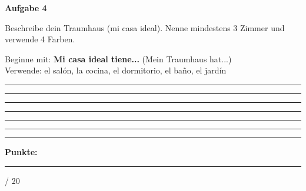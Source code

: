 \documentclass[11pt, a4paper]{article}
\newcommand{\fachfarbe}{spanisch}
\newcommand{\maxpunkte}{20}
\newcommand{\punktebox}[1]{\hfill\fbox{\small \_/#1}}
\newcommand{\luecke}[1]{\rule{#1}{0.4pt}}
\newenvironment{aufgabe}[1]{%
    \needspace{5\baselineskip}%
    \nopagebreak[4]%
    \vspace{10pt}
    \noindent\textbf{\textcolor{\fachfarbe}{Aufgabe #1}}
    \nopagebreak[4]%
    \vspace{5pt}
    \nopagebreak[4]%
    \begin{list}{}{\leftmargin=0pt}
    \item[]
}{%
    \end{list}
}
\newcommand{\es}[1]{\textcolor{\fachfarbe}{\textbf{#1}}}
\begin{document}

\begin{aufgabe}{4}
Beschreibe dein Traumhaus (mi casa ideal). Nenne mindestens 3 Zimmer und verwende 4 Farben. \punktebox{6}
\end{aufgabe}

\begin{hinweis}
Beginne mit: \es{Mi casa ideal tiene...} (Mein Traumhaus hat...)\\
Verwende: el salón, la cocina, el dormitorio, el baño, el jardín
\end{hinweis}

\vspace{0.5em}

\noindent
\rule{\textwidth}{0.4pt}\vspace{8pt}
\rule{\textwidth}{0.4pt}\vspace{8pt}
\rule{\textwidth}{0.4pt}\vspace{8pt}
\rule{\textwidth}{0.4pt}\vspace{8pt}
\rule{\textwidth}{0.4pt}\vspace{8pt}
\rule{\textwidth}{0.4pt}


\vspace{20pt}
\hrule
\vspace{10pt}

\begin{flushright}
\textbf{Punkte:} \luecke{1cm} / \maxpunkte
\end{flushright}
\end{document}
